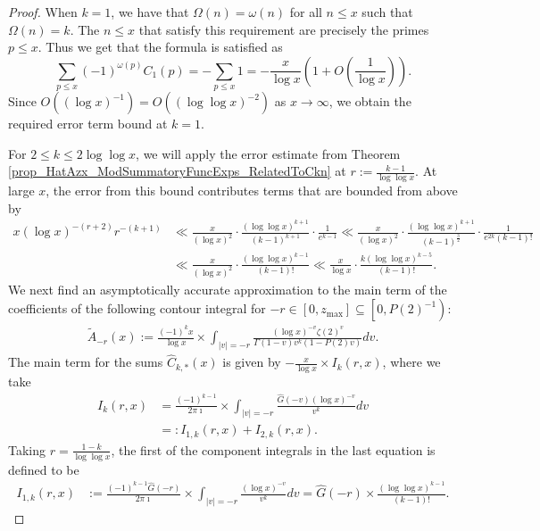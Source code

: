 \documentclass[11pt,reqno,a4letter]{article}
\numberwithin{figure}{section}
\numberwithin{table}{section}
\theoremstyle{plain}
\numberwithin{theorem}{section}
\theoremstyle{definition}
\begin{document}
\begin{proof} 
When $k = 1$, we have that $\Omega(n) = \omega(n)$ for all $n \leq x$ such that $\Omega(n) = k$. 
The $n \leq x$ that satisfy this requirement are precisely the primes $p \leq x$. 
Thus we get that the formula is satisfied as 
\[
\sum_{p \leq x} (-1)^{\omega(p)} C_1(p) = -\sum_{p \leq x} 1 = 
     - \frac{x}{\log x} \left(1 + O\left(\frac{1}{\log x}\right)\right). 
\]
Since $O((\log x)^{-1}) = O((\log\log x)^{-2})$ as $x \rightarrow \infty$, 
we obtain the required error term bound at $k = 1$. 

For $2 \leq k \leq 2\log\log x$, we will apply the error estimate from 
Theorem \ref{prop_HatAzx_ModSummatoryFuncExps_RelatedToCkn} at 
$r := \frac{k-1}{\log\log x}$. 
At large $x$, the error from this bound contributes terms that are bounded from above by 
\begin{align*} 
x (\log x)^{-(r+2)} r^{-(k+1)} & \ll \frac{x}{(\log x)^2} \cdot 
     \frac{(\log\log x)^{k+1}}{(k-1)^{k+1}} \cdot \frac{1}{e^{k-1}} 
     \ll \frac{x}{(\log x)^2} \cdot \frac{(\log\log x)^{k+1}}{(k-1)^{\frac{3}{2}}} \cdot 
     \frac{1}{e^{2k} (k-1)!} \\ 
     & \ll \frac{x}{(\log x)^2} \cdot \frac{(\log\log x)^{k-1}}{(k-1)!} \ll 
     \frac{x}{\log x} \cdot \frac{k (\log\log x)^{k-5}}{(k-1)!}. 
\end{align*} 
We next find an asymptotically accurate approximation to the main term of the coefficients 
of the following contour integral for $-r \in [0, z_{\max}] \subseteq \left[0, P(2)^{-1}\right)$: 
\begin{align} 
\label{eqn_WideTildeArx_CountourIntDef_v1} 
\widetilde{A}_{-r}(x) := 
     \frac{(-1)^k x}{\log x} 
     \times \int_{|v|=-r} \frac{(\log x)^{-v} \zeta(2)^{v}}{\Gamma(1 - v) 
     v^{k} (1 - P(2) v)} dv. 
\end{align} 
The main term for the sums $\widehat{C}_{k,\ast}(x)$ 
is given by $-\frac{x}{\log x} \times I_k(r, x)$, where we take 
\begin{align*}
I_k(r, x) & = \frac{(-1)^{k-1}}{2\pi\imath} \times \int_{|v|=-r} 
     \frac{\widehat{G}(-v) (\log x)^{-v}}{v^k} dv \\ 
     & =: I_{1,k}(r, x) + I_{2,k}(r, x). 
\end{align*}
Taking $r = \frac{1-k}{\log\log x}$, the 
first of the component integrals in the last equation is defined to be 
\begin{align*}
I_{1,k}(r, x) & := \frac{(-1)^{k-1} \widehat{G}(-r)}{2\pi\imath} \times \int_{|v|=-r} 
     \frac{(\log x)^{-v}}{v^k} dv = \widehat{G}(-r) \times \frac{(\log\log x)^{k-1}}{(k-1)!}. 

\end{align*}
\end{proof}
\end{document}

